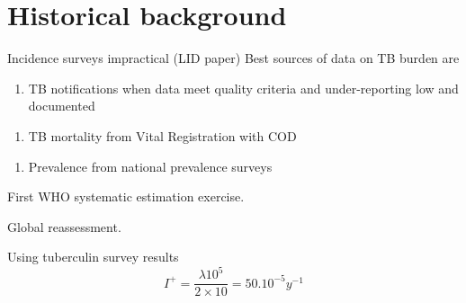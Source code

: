 \section{Historical background}

Incidence surveys impractical (LID paper)
Best sources of data on TB burden are 
\begin{enumerate}
\item TB notifications when data meet quality criteria and under-reporting low and documented
\end{enumerate}
\begin{enumerate}
\item TB mortality from Vital Registration with COD
\end{enumerate}
\begin{enumerate}
\item Prevalence from national prevalence surveys
\end{enumerate}

First WHO systematic estimation exercise\cite{1600578}.

Global reassessment\cite{10517722}.

Using tuberculin survey results\cite{Styblo1985}
$$I^+ = \frac{\lambda 10^5}{2 \times 10} = 50.10^{-5} y^{-1}$$

  
  
  
  